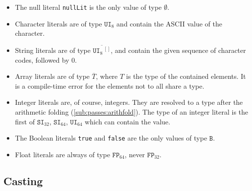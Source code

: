 \documentclass{article}
\newcommand{\R}[1]{\mathtt{#1}}
\begin{document}
\begin{itemize}
  \item{The null literal \texttt{nullLit} is the only value of type $\emptyset$.}
  \item{Character literals are of type $\R{UI}_{8}$ and contain the ASCII value
    of the character.}
  \item{String literals are of type $\overline{\R{UI}_{8}\,\!^{[]}}$, and contain
    the given sequence of character codes, followed by 0.}
  \item{Array literals are of type $\overline{T}$, where $T$ is the type of the
    contained elements. It is a compile-time error for the elements not to all
    share a type.}
  \item{Integer literals are, of course, integers. They are resolved to a type
    after the arithmetic folding (\ref{sub:passes:arithfold}). The type of an
    integer literal is the first of $\R{SI}_{32}$, $\R{SI}_{64}$, $\R{UI}_{64}$
    which can contain the value.}
  \item{The Boolean literals \texttt{true} and \texttt{false} are the only
    values of type $\R{B}$.}
  \item{Float literals are always of type $\R{FP}_{64}$, never $\R{FP}_{32}$.}
\end{itemize}

\subsection{Casting}
\label{sub:types:casting}
\end{document}
